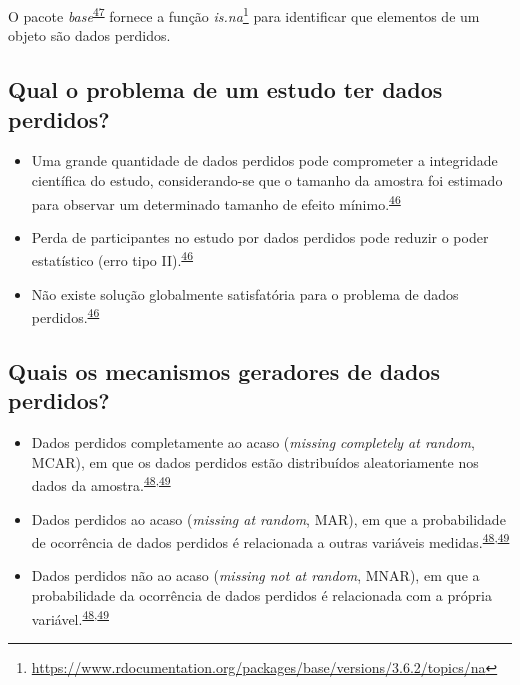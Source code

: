 \documentclass[
  a4paper,
]{book}
\renewcommand{\href}[2]{#2\footnote{\url{#1}}}
\newenvironment{infobox}[1]
  {
  \begin{itemize}
  \renewcommand{\labelitemi}{
    \raisebox{-.7\height}[0pt][0pt]{
      {\setkeys{Gin}{width=3em,keepaspectratio}
        \texttt{[image: \#1]}}
    }
  }
  \setlength{\fboxsep}{1em}
  \begin{blackbox}
  \item
  }
  {
  \end{blackbox}
  \end{itemize}
  }
\begin{document}
\begin{infobox}{images/Rlogo}
O pacote \emph{base}\textsuperscript{\protect\hyperlink{ref-base-2}{47}} fornece a função \href{https://www.rdocumentation.org/packages/base/versions/3.6.2/topics/na}{\emph{is.na}} para identificar que elementos de um objeto são dados perdidos.

\end{infobox}

\hypertarget{qual-o-problema-de-um-estudo-ter-dados-perdidos}{%
\subsection{Qual o problema de um estudo ter dados perdidos?}\label{qual-o-problema-de-um-estudo-ter-dados-perdidos}}

\begin{itemize}
\item
  Uma grande quantidade de dados perdidos pode comprometer a integridade científica do estudo, considerando-se que o tamanho da amostra foi estimado para observar um determinado tamanho de efeito mínimo.\textsuperscript{\protect\hyperlink{ref-Altman2007}{46}}
\item
  Perda de participantes no estudo por dados perdidos pode reduzir o poder estatístico (erro tipo II).\textsuperscript{\protect\hyperlink{ref-Altman2007}{46}}
\item
  Não existe solução globalmente satisfatória para o problema de dados perdidos.\textsuperscript{\protect\hyperlink{ref-Altman2007}{46}}
\end{itemize}

\hypertarget{quais-os-mecanismos-geradores-de-dados-perdidos}{%
\subsection{Quais os mecanismos geradores de dados perdidos?}\label{quais-os-mecanismos-geradores-de-dados-perdidos}}

\begin{itemize}
\item
  Dados perdidos completamente ao acaso (\emph{missing completely at random}, MCAR), em que os dados perdidos estão distribuídos aleatoriamente nos dados da amostra.\textsuperscript{\protect\hyperlink{ref-Heymans2022}{48},\protect\hyperlink{ref-carpenter2021}{49}}
\item
  Dados perdidos ao acaso (\emph{missing at random}, MAR), em que a probabilidade de ocorrência de dados perdidos é relacionada a outras variáveis medidas.\textsuperscript{\protect\hyperlink{ref-Heymans2022}{48},\protect\hyperlink{ref-carpenter2021}{49}}
\item
  Dados perdidos não ao acaso (\emph{missing not at random}, MNAR), em que a probabilidade da ocorrência de dados perdidos é relacionada com a própria variável.\textsuperscript{\protect\hyperlink{ref-Heymans2022}{48},\protect\hyperlink{ref-carpenter2021}{49}}
\end{itemize}
\end{document}
